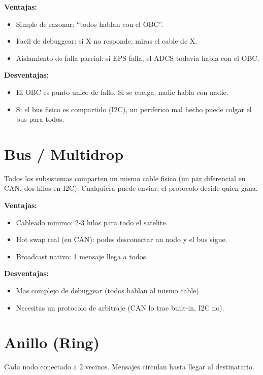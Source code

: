 \documentclass[11pt,a4paper,oneside,openright]{book}
\begin{document}
\textbf{Ventajas:}
\begin{itemize}[leftmargin=2em]
  \item Simple de razonar: ``todos hablan con el OBC''.
  \item Facil de debuggear: si X no responde, miras el cable de X.
  \item Aislamiento de falla parcial: si EPS falla, el ADCS todavia
    habla con el OBC.
\end{itemize}

\textbf{Desventajas:}
\begin{itemize}[leftmargin=2em]
  \item El OBC es punto unico de fallo. Si se cuelga, nadie habla
    con nadie.
  \item Si el bus fisico es compartido (I2C), un periferico mal hecho
    puede colgar el bus para todos.
\end{itemize}

\section{Bus / Multidrop}

Todos los subsistemas comparten un mismo cable fisico (un par
diferencial en CAN, dos hilos en I2C). Cualquiera puede enviar; el
protocolo decide quien gana.

\textbf{Ventajas:}
\begin{itemize}[leftmargin=2em]
  \item Cableado minimo: 2-3 hilos para todo el satelite.
  \item Hot swap real (en CAN): podes desconectar un nodo y el bus
    sigue.
  \item Broadcast nativo: 1 mensaje llega a todos.
\end{itemize}

\textbf{Desventajas:}
\begin{itemize}[leftmargin=2em]
  \item Mas complejo de debuggear (todos hablan al mismo cable).
  \item Necesitas un protocolo de arbitraje (CAN lo trae built-in,
    I2C no).
\end{itemize}

\section{Anillo (Ring)}

Cada nodo conectado a 2 vecinos. Mensajes circulan hasta llegar al
destinatario.
\end{document}

